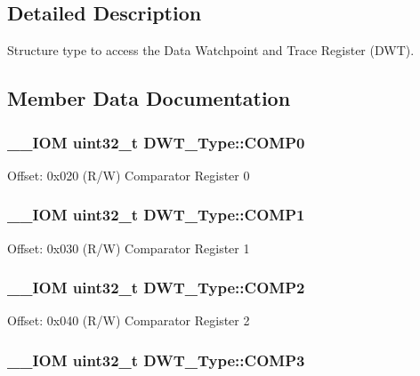\subsection{Detailed Description}
Structure type to access the Data Watchpoint and Trace Register (D\-W\-T). 

\subsection{Member Data Documentation}
\hypertarget{struct_d_w_t___type_a61c2965af5bc0643f9af65620b0e67c9}{
\subsubsection[{C\-O\-M\-P0}]{\setlength{\rightskip}{0pt plus 5cm}\-\_\-\-\_\-\-I\-O\-M uint32\-\_\-t D\-W\-T\-\_\-\-Type\-::\-C\-O\-M\-P0}}\label{struct_d_w_t___type_a61c2965af5bc0643f9af65620b0e67c9}
Offset\-: 0x020 (R/\-W) Comparator Register 0 \hypertarget{struct_d_w_t___type_a38714af6b7fa7c64d68f5e1efbe7a931}{
\subsubsection[{C\-O\-M\-P1}]{\setlength{\rightskip}{0pt plus 5cm}\-\_\-\-\_\-\-I\-O\-M uint32\-\_\-t D\-W\-T\-\_\-\-Type\-::\-C\-O\-M\-P1}}\label{struct_d_w_t___type_a38714af6b7fa7c64d68f5e1efbe7a931}
Offset\-: 0x030 (R/\-W) Comparator Register 1 \hypertarget{struct_d_w_t___type_a5ae6dde39989f27bae90afc2347deb46}{
\subsubsection[{C\-O\-M\-P2}]{\setlength{\rightskip}{0pt plus 5cm}\-\_\-\-\_\-\-I\-O\-M uint32\-\_\-t D\-W\-T\-\_\-\-Type\-::\-C\-O\-M\-P2}}\label{struct_d_w_t___type_a5ae6dde39989f27bae90afc2347deb46}
Offset\-: 0x040 (R/\-W) Comparator Register 2 \hypertarget{struct_d_w_t___type_a85eb73d1848ac3f82d39d6c3e8910847}{
\subsubsection[{C\-O\-M\-P3}]{\setlength{\rightskip}{0pt plus 5cm}\-\_\-\-\_\-\-I\-O\-M uint32\-\_\-t D\-W\-T\-\_\-\-Type\-::\-C\-O\-M\-P3}}\label{struct_d_w_t___type_a85eb73d1848ac3f82d39d6c3e8910847}
